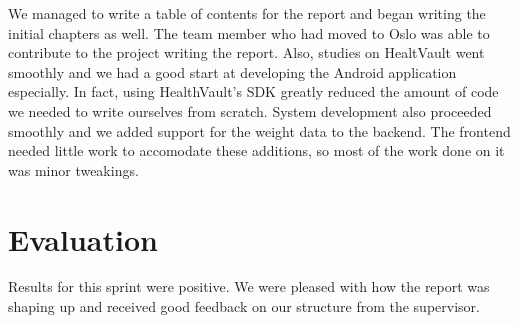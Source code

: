 We managed to write a table of contents for the report and began writing the initial chapters as well.
The team member who had moved to Oslo was able to contribute to the project writing the report.
Also, studies on HealtVault went smoothly and we had a good start at developing the Android application
especially. In fact, using HealthVault's SDK greatly reduced the amount of code we needed to write ourselves
from scratch.
System development also proceeded smoothly and we added support for the weight data to the backend.
The frontend needed little work to accomodate these additions, so most of the work done on it
was minor tweakings.

\section{Evaluation}

Results for this sprint were positive. We were pleased with how the report was shaping up and
received good feedback on our structure from the supervisor.



